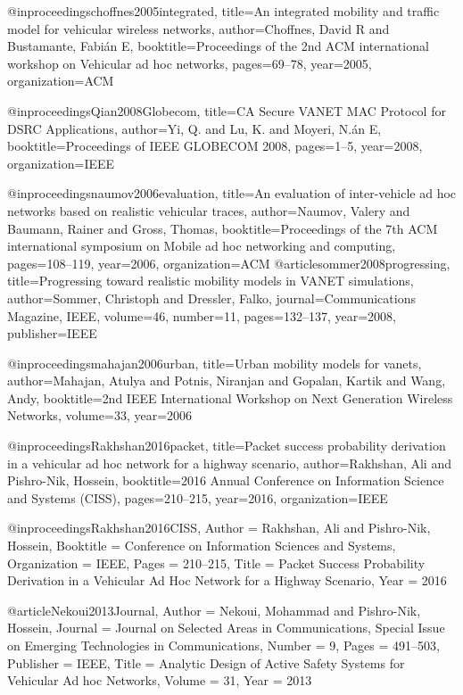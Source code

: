 {{{{{{@inproceedings{choffnes2005integrated,
	title={An integrated mobility and traffic model for vehicular wireless networks},
	author={Choffnes, David R and Bustamante, Fabi{\'a}n E},
	booktitle={Proceedings of the 2nd ACM international workshop on Vehicular ad hoc networks},
	pages={69--78},
	year={2005},
	organization={ACM}
}

@inproceedings{Qian2008Globecom,
	title={CA Secure VANET MAC Protocol for DSRC Applications},
	author={Yi, Q. and Lu, K. and Moyeri, N.{\'a}n E},
	booktitle={Proceedings of IEEE GLOBECOM 2008},
	pages={1--5},
	year={2008},
	organization={IEEE}
}





@inproceedings{naumov2006evaluation,
	title={An evaluation of inter-vehicle ad hoc networks based on realistic vehicular traces},
	author={Naumov, Valery and Baumann, Rainer and Gross, Thomas},
	booktitle={Proceedings of the 7th ACM international symposium on Mobile ad hoc networking and computing},
	pages={108--119},
	year={2006},
	organization={ACM}
}
@article{sommer2008progressing,
	title={Progressing toward realistic mobility models in VANET simulations},
	author={Sommer, Christoph and Dressler, Falko},
	journal={Communications Magazine, IEEE},
	volume={46},
	number={11},
	pages={132--137},
	year={2008},
	publisher={IEEE}
}




@inproceedings{mahajan2006urban,
	title={Urban mobility models for vanets},
	author={Mahajan, Atulya and Potnis, Niranjan and Gopalan, Kartik and Wang, Andy},
	booktitle={2nd IEEE International Workshop on Next Generation Wireless Networks},
	volume={33},
	year={2006}
}

@inproceedings{Rakhshan2016packet,
	title={Packet success probability derivation in a vehicular ad hoc network for a highway scenario},
	author={Rakhshan, Ali and Pishro-Nik, Hossein},
	booktitle={2016 Annual Conference on Information Science and Systems (CISS)},
	pages={210--215},
	year={2016},
	organization={IEEE}
}

@inproceedings{Rakhshan2016CISS,
	Author = {Rakhshan, Ali and Pishro-Nik, Hossein},
	Booktitle = {Conference on Information Sciences and Systems},
	Organization = {IEEE},
	Pages = {210--215},
	Title = {Packet Success Probability Derivation in a Vehicular Ad Hoc Network for a Highway Scenario},
	Year = {2016}}

@article{Nekoui2013Journal,
	Author = {Nekoui, Mohammad and Pishro-Nik, Hossein},
	Journal = {Journal on Selected Areas in Communications, Special Issue on Emerging Technologies in Communications},
	Number = {9},
	Pages = {491--503},
	Publisher = {IEEE},
	Title = {Analytic Design of Active Safety Systems for Vehicular Ad hoc Networks},
	Volume = {31},
	Year = {2013}}


}}}}}}
